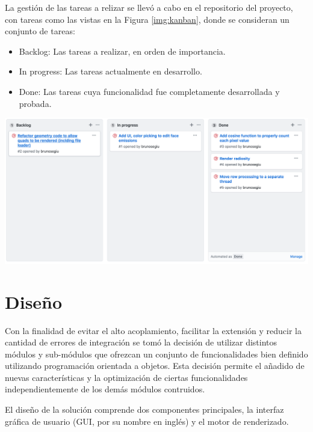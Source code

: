 La gestión de las tareas a relizar se llevó a cabo en el repositorio del proyecto, con tareas como las vistas en la Figura \ref{img:kanban}, donde se consideran un conjunto de tareas:

\begin{itemize}
	\item Backlog: Las tareas a realizar, en orden de importancia.
	\item In progress: Las tareas actualmente en desarrollo.
	\item Done: Las tareas cuya funcionalidad fue completamente desarrollada y probada.
\end{itemize}

\vspace{5mm}
\begin{minipage}[h]{0.8\linewidth}
	\centering
	\includegraphics[width=\linewidth]{assets/kanban}
	\label{img:kanban}
\end{minipage}

\section{Diseño}
\label{sec:disenio}

Con la finalidad de evitar el alto acoplamiento, facilitar la extensión y reducir la cantidad de errores de integración se tomó la decisión de utilizar distintos módulos y sub-módulos que ofrezcan un conjunto de funcionalidades bien definido utilizando programación orientada a objetos. Esta decisión permite el añadido de nuevas características y la optimización de ciertas funcionalidades independientemente de los demás módulos contruidos.

El diseño de la solución comprende dos componentes principales, la interfaz gráfica de usuario (GUI, por su nombre en inglés) y el motor de renderizado.

